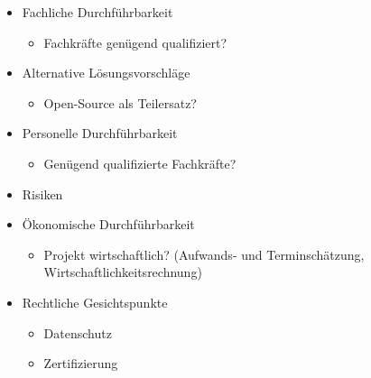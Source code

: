 \begin{itemize}
\item Fachliche Durchführbarkeit
\begin{itemize}
\item Fachkräfte genügend qualifiziert?
\end{itemize}
\item Alternative Lösungsvorschläge
\begin{itemize}
\item Open-Source als Teilersatz?
\end{itemize}
\item Personelle Durchführbarkeit
\begin{itemize}
\item Genügend qualifizierte Fachkräfte?
\end{itemize}
\item Risiken
\item Ökonomische Durchführbarkeit
\begin{itemize}
\item Projekt wirtschaftlich? (Aufwands- und Terminschätzung, Wirtschaftlichkeitsrechnung)
\end{itemize}
\item Rechtliche Gesichtspunkte
\begin{itemize}
\item Datenschutz
\item Zertifizierung
\end{itemize}
\end{itemize}